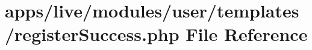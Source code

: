 \hypertarget{live_2modules_2user_2templates_2register_success_8php}{\section{apps/live/modules/user/templates/register\-Success.php File Reference}
\label{live_2modules_2user_2templates_2register_success_8php}
}
